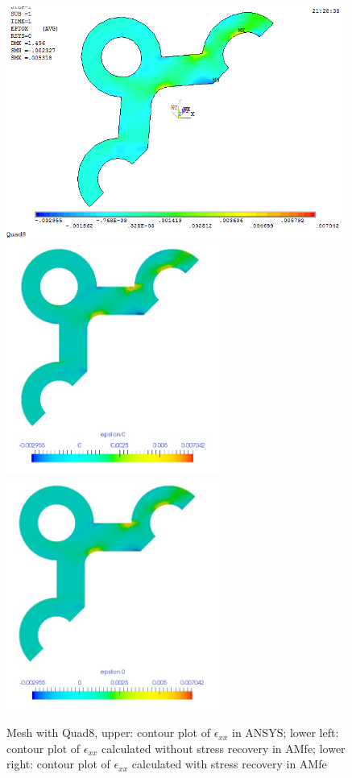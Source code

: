 \begin{figure}[htbp]
	\begin{center}
		\includegraphics[width=11cm,clip]{Quad8_Exx.png} 	
		\includegraphics[width=7cm,clip]{Quad8_Exx_PD.png} 	
		\includegraphics[width=7cm,clip]{Quad8_Exx_P.png} 		
		\caption{Mesh with Quad8, upper: contour plot of $\epsilon_{xx}$ in ANSYS; lower left: contour plot of $\epsilon_{xx}$ calculated without stress recovery in AMfe; lower right: contour plot of $\epsilon_{xx}$ calculated with stress recovery in AMfe} \label{fig: Quad8_Exx}
	\end{center}
\end{figure}
\clearpage 

